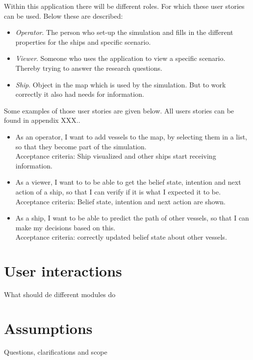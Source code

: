 Within this application there will be different roles. For which these user stories can be used. Below these are described:
\begin{itemize}
	\item \emph{Operator}. The person who set-up the simulation and fills in the different properties for the ships and specific scenario.
	\item \emph{Viewer}. Someone who uses the application to view a specific scenario. Thereby trying to answer the research questions.
	\item \emph{Ship}. Object in the map which is used by the simulation. But to work correctly it also had needs for information.
\end{itemize}

Some examples of those user stories are given below. All users stories can be found in appendix XXX.. 

\begin{itemize}
	\item As an operator, I want to add vessels to the map, by selecting them in a list, so that they become part of the simulation. \\
	Acceptance criteria: Ship visualized and other ships start receiving information.
	\item As a viewer, I want to to be able to get the belief state, intention and next action of a ship, so that I can verify if it is what I expected it to be. \\
	Acceptance criteria: Belief state, intention and next action are shown.
	\item As a ship, I want to be able to predict the path of other vessels, so that I can make my decisions based on this. \\
	Acceptance criteria: correctly updated belief state about other vessels.
\end{itemize}

\section{User interactions}
What should de different modules do

\section{Assumptions}
Questions, clarifications and scope